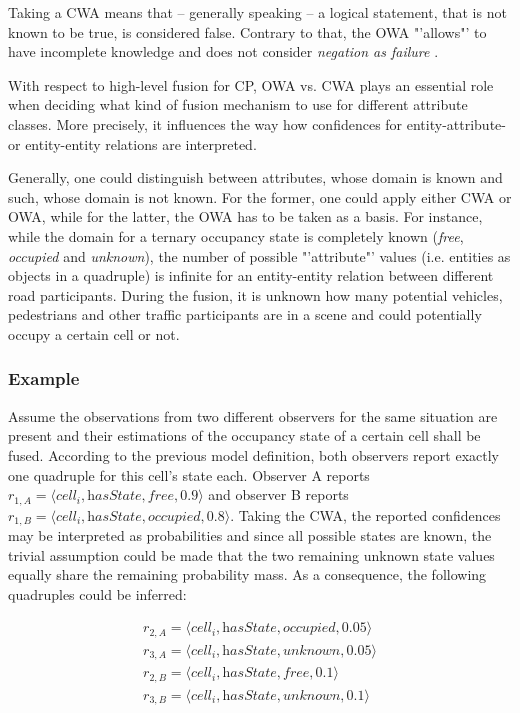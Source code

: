 Taking a CWA means that – generally speaking – a logical statement, that is not known to be true, is considered false. Contrary to that, the OWA "'allows"' to have incomplete knowledge and does not consider \textit{negation as failure} \cite{wiki:neaf}. 

With respect to high-level fusion for CP, OWA vs. CWA plays an essential role when deciding what kind of fusion mechanism to use for different attribute classes. More precisely, it influences the way how confidences for entity-attribute- or entity-entity relations are interpreted. 

Generally, one could distinguish between attributes, whose domain is known and such, whose domain is not known. For the former, one could apply either CWA or OWA, while for the latter, the OWA has to be taken as a basis. For instance, while the domain for a ternary occupancy state is completely known (\textit{free}, \textit{occupied} and \textit{unknown}), the number of possible "'attribute"' values (i.e. entities as objects in a quadruple) is infinite for an entity-entity relation between different road participants. During the fusion, it is unknown how many potential vehicles, pedestrians and other traffic participants are in a scene and could potentially occupy a certain cell or not.

\subsubsection{Example}
Assume the observations from two different observers for the same situation are present and their estimations of the occupancy state of a certain cell shall be fused. According to the previous model definition, both observers report exactly one quadruple for this cell's state each. Observer A reports $r_{1,A} = \langle \textit{cell}_i, \textit{hasState}, \textit{free}, 0.9 \rangle$ and observer B reports $r_{1,B} = \langle \textit{cell}_i, \textit{hasState}, \textit{occupied}, 0.8 \rangle$. Taking the CWA, the reported confidences may be interpreted as probabilities and since all possible states are known, the trivial assumption could be made that the two remaining unknown state values equally share the remaining probability mass. As a consequence, the following quadruples could be inferred:

\begin{gather*}
	r_{2,A} = \langle \textit{cell}_i, \textit{hasState}, \textit{occupied}, 0.05 \rangle \\
	r_{3,A} = \langle \textit{cell}_i, \textit{hasState}, \textit{unknown}, 0.05 \rangle \\
	r_{2,B} = \langle \textit{cell}_i, \textit{hasState}, \textit{free}, 0.1 \rangle \\
	r_{3,B} = \langle \textit{cell}_i, \textit{hasState}, \textit{unknown}, 0.1 \rangle \\
\end{gather*}

